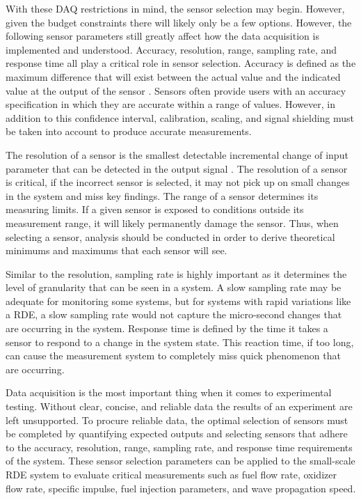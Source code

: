 With these DAQ restrictions in mind, the sensor selection may begin. However, given the budget constraints there will likely only be a few options. However, the following sensor parameters still greatly affect how the data acquisition is implemented and understood. Accuracy, resolution, range, sampling rate, and response time all play a critical role in sensor selection. Accuracy is defined as the maximum difference that will exist between the actual value and the indicated value at the output of the sensor \cite{ni-fundamentals:2023}. Sensors often provide users with an accuracy specification in which they are accurate within a range of values. However, in addition to this confidence interval, calibration, scaling, and signal shielding must be taken into account to produce accurate measurements.

The resolution of a sensor is the smallest detectable incremental change of input parameter that can be detected in the output signal \cite{ni-fundamentals:2023}. The resolution of a sensor is critical, if the incorrect sensor is selected, it may not pick up on small changes in the system and miss key findings. The range of a sensor determines its measuring limits. If a given sensor is exposed to conditions outside its measurement range, it will likely permanently damage the sensor. Thus, when selecting a sensor, analysis should be conducted in order to derive theoretical minimums and maximums that each sensor will see.

Similar to the resolution, sampling rate is highly important as it determines the level of granularity that can be seen in a system. A slow sampling rate may be adequate for monitoring some systems, but for systems with rapid variations like a RDE, a slow sampling rate would not capture the micro-second changes that are occurring in the system. Response time is defined by the time it takes a sensor to respond to a change in the system state. This reaction time, if too long, can cause the measurement system to completely miss quick phenomenon that are occurring.

Data acquisition is the most important thing when it comes to experimental testing. Without clear, concise, and reliable data the results of an experiment are left unsupported. To procure reliable data, the optimal selection of sensors must be completed by quantifying expected outputs and selecting sensors that adhere to the accuracy, resolution, range, sampling rate, and response time requirements of the system. These sensor selection parameters can be applied to the small-scale RDE system to evaluate critical measurements such as fuel flow rate, oxidizer flow rate, specific impulse, fuel injection parameters, and wave propagation speed.
